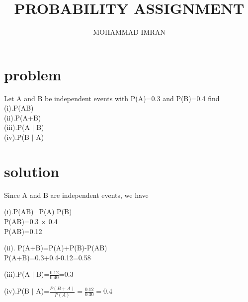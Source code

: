 \documentclass[journal,12pt,twocolumn]{article}
\title{PROBABILITY ASSIGNMENT}
\author{MOHAMMAD IMRAN}
\begin{document}
\maketitle
\tableofcontents
\bigskip

\section{problem }

Let A and B be independent events with P(A)=0.3 and P(B)=0.4 find \\
(i).P(AB)\\
     (ii).P(A+B) \\
(iii).P(A $\mid$ B)   \\
       (iv).P(B $\mid$ A)
\section{solution }  


Since A and B are independent events, we have \\

\begin{center}
(i).P(AB)=P(A) P(B)\\
 \vspace{0.5cm}
P(AB)=0.3 $\times$ 0.4\\
 \vspace{0.5cm}
P(AB)=0.12
\end{center}

\begin{center}
(ii). P(A+B)=P(A)+P(B)-P(AB)\\
\vspace{0.5cm}
P(A+B)=0.3+0.4-0.12=0.58
\end{center}

\begin{center}
(iii).P(A $\mid$ B)=$\frac{0.12}{0.40}$=0.3
\end{center}

\begin{center}
(iv).P(B $\mid$ A)=$\frac{P(B+A)}{P(A)}=\frac{0.12}{0.30}=0.4$
\end{center}
 
\end{document}

